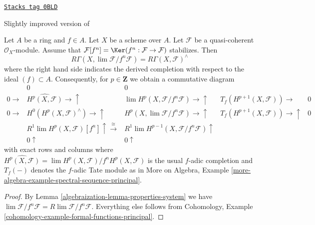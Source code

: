 \begin{lemma}
\label{algebraization-lemma-formal-functions-principal}
\href{https://stacks.math.columbia.edu/tag/0BLD}{\texttt{Stacks tag 0BLD}}

\begin{reference}
Slightly improved version of \cite[Lemma 1.6]{Bhatt-local}
\end{reference}
Let $A$ be a ring and $f \in A$. Let $X$ be a scheme over $A$.
Let $\mathcal{F}$ be a quasi-coherent $\mathcal{O}_X$-module.
Assume that $\mathcal{F}[f^n] = \Ker(f^n : \mathcal{F} \to \mathcal{F})$
stabilizes. Then
$$
R\Gamma(X, \lim \mathcal{F}/f^n\mathcal{F}) =
R\Gamma(X, \mathcal{F})^\wedge
$$
where the right hand side indicates the derived completion
with respect to the ideal $(f) \subset A$. Consequently, for
$p \in \mathbf{Z}$ we obtain a commutative diagram
$$
\begin{array}{ccccc} & 0 & 0 &  &  \\ 0 \longrightarrow & \widehat{H^p(X, \mathcal{F})} \longrightarrow\uparrow & \lim H^p(X, \mathcal{F}/f^n\mathcal{F}) \longrightarrow\uparrow & T_f(H^{p + 1}(X, \mathcal{F})) \longrightarrow & 0 \\ 0 \longrightarrow & H^0(H^p(X, \mathcal{F})^\wedge) \longrightarrow\uparrow & H^p(X, \lim \mathcal{F}/f^n\mathcal{F}) \longrightarrow\uparrow & T_f(H^{p + 1}(X, \mathcal{F})) \longrightarrow\uparrow & 0 \\  & R^1\lim H^p(X, \mathcal{F})[f^n] \uparrow\overset{\cong}{\longrightarrow} & R^1\lim H^{p - 1}(X, \mathcal{F}/f^n\mathcal{F}) \uparrow &  &  \\  & 0 \uparrow & 0 \uparrow &  & \end{array}
$$
with exact rows and columns where
$\widehat{H^p(X, \mathcal{F})} =
\lim H^p(X, \mathcal{F})/f^n H^p(X, \mathcal{F})$
is the usual $f$-adic completion
and $T_f(-)$ denotes the $f$-adic Tate module as in
More on Algebra, Example
\ref{more-algebra-example-spectral-sequence-principal}.
\end{lemma}

\begin{proof}

By Lemma \ref{algebraization-lemma-properties-system} we have
$\lim \mathcal{F}/f^n\mathcal{F} = R\lim \mathcal{F}/f^n \mathcal{F}$.
Everything else follows from Cohomology, Example
\ref{cohomology-example-formal-functions-principal}.
\end{proof}

